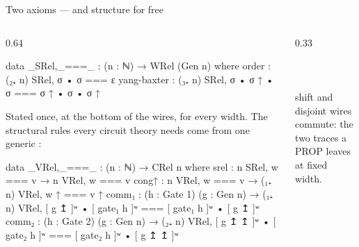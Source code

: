 \begin{frame}{Two axioms --- and structure for free}
\begin{columns}[c]
\begin{column}{0.64\textwidth}
\begin{code}
data _SRel,_===_ : (n : ℕ) → WRel (Gen n) where
  order       : (₂₊ n) SRel, σ • σ === ε
  yang-baxter : (₃₊ n) SRel, σ • σ ↑ • σ === σ ↑ • σ • σ ↑
\end{code}
\vspace{2pt}
{\small Stated once, at the bottom of the wires, for every width. The structural
rules every circuit theory needs come from one generic :}
\renewcommand{\AgdaCodeStyle}{\scriptsize}
\begin{code}
data _VRel,_===_ : (n : ℕ) → CRel n where
  srel  : n SRel, w === v → n VRel, w === v
  cong↑ : n VRel, w === v → (₁₊ n) VRel, w ↑ === v ↑
  comm₁ : (h : Gate 1) (g : Gen n) →
          (₁₊ n) VRel, [ g ↥ ]ʷ • [ gate₁ h ]ʷ === [ gate₁ h ]ʷ • [ g ↥ ]ʷ
  comm₂ : (h : Gate 2) (g : Gen n) →
          (₂₊ n) VRel, [ g ↥ ↥ ]ʷ • [ gate₂ h ]ʷ === [ gate₂ h ]ʷ • [ g ↥ ↥ ]ʷ
\end{code}
\end{column}
\begin{column}{0.33\textwidth}
\centering
{}\\[3pt]
\\[12pt]
\\[3pt]
\\[14pt]
{\small shift and disjoint wires commute: the two traces a PROP leaves at
fixed width.}
\end{column}
\end{columns}
\end{frame}

